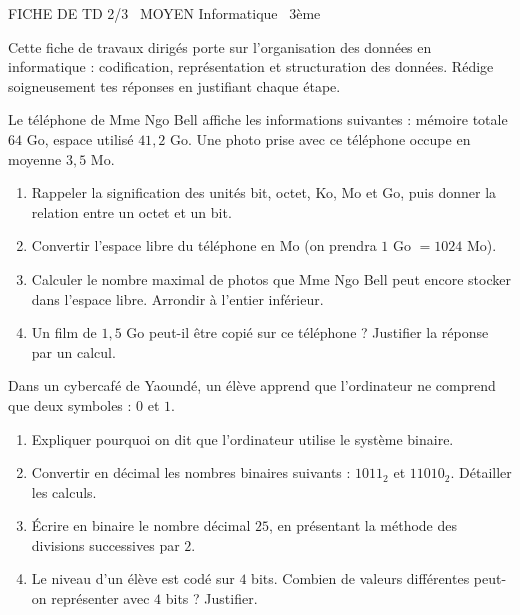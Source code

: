 \documentclass[11pt]{article}
\begin{document}
\begin{tcolorbox}[enhanced,colback=popink,colframe=popink,arc=10pt,boxrule=0pt,left=12pt,right=12pt,top=9pt,bottom=9pt]
{\color{white}\popxbold\small FICHE DE TD 2/3 \textbullet\ MOYEN \hfill Informatique \textbullet\ 3ème\par}
\end{tcolorbox}
\vspace{4pt}
Cette fiche de travaux dirigés porte sur l'organisation des données en informatique : codification, représentation et structuration des données. Rédige soigneusement tes réponses en justifiant chaque étape.

\begin{exercice}
Le téléphone de Mme Ngo Bell affiche les informations suivantes : mémoire totale $64$ Go, espace utilisé $41{,}2$ Go. Une photo prise avec ce téléphone occupe en moyenne $3{,}5$ Mo.
\begin{enumerate}
\item Rappeler la signification des unités bit, octet, Ko, Mo et Go, puis donner la relation entre un octet et un bit.
\item Convertir l'espace libre du téléphone en Mo (on prendra $1$ Go $= 1024$ Mo).
\item Calculer le nombre maximal de photos que Mme Ngo Bell peut encore stocker dans l'espace libre. Arrondir à l'entier inférieur.
\item Un film de $1{,}5$ Go peut-il être copié sur ce téléphone ? Justifier la réponse par un calcul.
\end{enumerate}
\end{exercice}

\begin{exercice}
Dans un cybercafé de Yaoundé, un élève apprend que l'ordinateur ne comprend que deux symboles : $0$ et $1$.
\begin{enumerate}
\item Expliquer pourquoi on dit que l'ordinateur utilise le système binaire.
\item Convertir en décimal les nombres binaires suivants : $1011_2$ et $11010_2$. Détailler les calculs.
\item Écrire en binaire le nombre décimal $25$, en présentant la méthode des divisions successives par $2$.
\item Le niveau d'un élève est codé sur $4$ bits. Combien de valeurs différentes peut-on représenter avec $4$ bits ? Justifier.
\end{enumerate}
\end{exercice}
\end{document}
